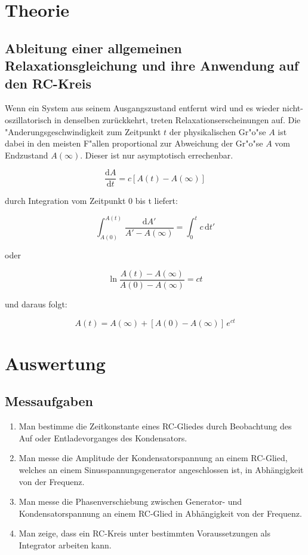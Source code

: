\documentclass{scrartcl}
\begin{document}
	
	\section{Theorie}

		\subsection{Ableitung einer allgemeinen Relaxationsgleichung und ihre Anwendung auf den RC-Kreis}

			Wenn ein System aus seinem Ausgangszustand entfernt wird und es wieder nicht-oszillatorisch in denselben zurückkehrt, treten Relaxationserscheinungen auf. Die "Anderungsgeschwindigkeit zum Zeitpunkt $t$ der physikalischen Gr"o"se $A$ ist dabei in den meisten F"allen proportional zur Abweichung der Gr"o"se $A$ vom Endzustand $A(\infty)$. Dieser ist nur asymptotisch errechenbar.

			\begin{equation}
				\frac{\mathrm{d} A}{\mathrm{d} t} = c \left[ A(t) - A(\infty) \right]
			\end{equation}

			durch Integration vom Zeitpunkt 0 bis t liefert:

			\begin{equation}
				\int_{A(0)}^{A(t)} \! \frac{\mathrm{d} A'}{A' - A(\infty)} = \int_0^t \! c \, \mathrm{d} t'
			\end{equation}

			oder

			\begin{equation}
				\ln{\frac{A(t) - A(\infty)}{A(0) - A(\infty)}} = c t
			\end{equation}

			und daraus folgt:

			\begin{equation}
				A(t) = A(\infty) + \left[ A(0) - A(\infty) \right] \, e^{c t} 
			\end{equation}


	\section{Auswertung}

		\subsection{Messaufgaben}

			\begin{enumerate}
				\item Man bestimme die Zeitkonstante eines RC-Gliedes durch Beobachtung des Auf oder Entladevorganges des Kondensators.
				\item Man messe die Amplitude der Kondensatorspannung an einem RC-Glied, welches an einem Sinusspannungsgenerator angeschlossen ist, in Abhängigkeit von der Frequenz.
				\item Man messe die Phasenverschiebung zwischen Generator- und Kondensatorspannung an einem RC-Glied in Abhängigkeit von der Frequenz.
				\item Man zeige, dass ein RC-Kreis unter bestimmten Voraussetzungen als Integrator arbeiten kann.
			\end{enumerate}
\end{document}

